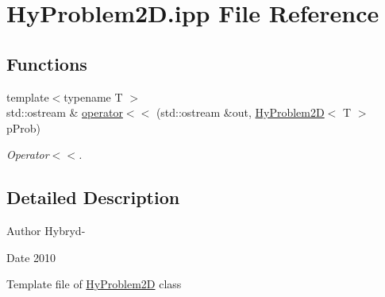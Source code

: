 \hypertarget{HyProblem2D_8ipp}{
\section{HyProblem2D.ipp File Reference}
\label{HyProblem2D_8ipp}
}
\subsection*{Functions}
\begin{DoxyCompactItemize}
\item 
\hypertarget{HyProblem2D_8ipp_abdd81a0c6453f266afca21e49aa1815c}{
{\footnotesize template$<$typename T $>$ }\\std::ostream \& \hyperlink{HyProblem2D_8ipp_abdd81a0c6453f266afca21e49aa1815c}{operator$<$$<$} (std::ostream \&out, \hyperlink{classHyProblem2D}{HyProblem2D}$<$ T $>$ pProb)}
\label{HyProblem2D_8ipp_abdd81a0c6453f266afca21e49aa1815c}

\begin{DoxyCompactList}\small\item\em Operator$<$$<$. \item\end{DoxyCompactList}\end{DoxyCompactItemize}


\subsection{Detailed Description}
\begin{DoxyAuthor}{Author}
Hybryd-\/ 
\end{DoxyAuthor}
\begin{DoxyDate}{Date}
2010
\end{DoxyDate}
Template file of \hyperlink{classHyProblem2D}{HyProblem2D} class 